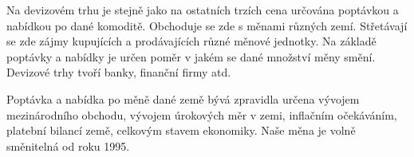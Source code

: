 Na devizovém trhu je stejně jako na ostatních trzích cena určována poptávkou a nabídkou po dané komoditě. Obchoduje se zde s měnami různých zemí. Střetávají se zde zájmy kupujících a prodávajících různé měnové jednotky. Na základě poptávky a nabídky je určen poměr v jakém se dané množství měny smění. Devizové trhy tvoří banky, finanční firmy atd.

Poptávka a nabídka po měně dané země bývá zpravidla určena vývojem mezinárodního obchodu, vývojem úrokových měr v zemi, inflačním očekáváním, platební bilancí země, celkovým stavem ekonomiky. Naše měna je volně směnitelná od roku 1995.
